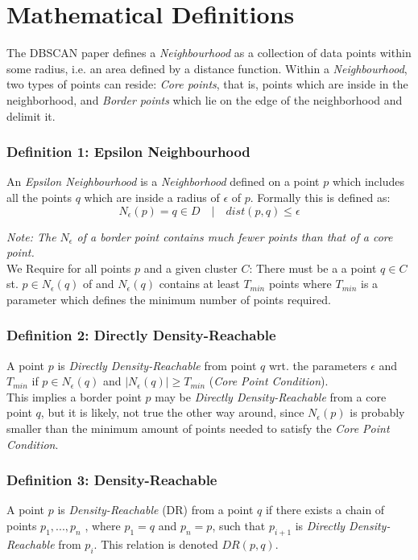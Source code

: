 \section{Mathematical Definitions}

The DBSCAN paper defines a \textit{Neighbourhood} as a collection of data points within some radius, i.e. an area defined by a distance function. Within a \textit{Neighbourhood}, two types of points can reside: \textit{Core points}, that is, points which are inside in the neighborhood, and \textit{Border points } which lie on the edge of the neighborhood and delimit it. 

\subsubsection*{Definition 1: Epsilon Neighbourhood}
An \textit{Epsilon Neighbourhood} is a \textit{Neighborhood} defined on a point $p$ which includes all the points $q$ which are inside a radius of $\epsilon$ of $p$. Formally this is defined as:\\

$$N_{\epsilon} (p) = q \in D \quad|\quad dist(p,q) \leq \epsilon$$

\textit{Note: The $N_{\epsilon}$ of a border point contains much fewer points than that of a core point. }\\

We Require for all points $p$ and a given cluster $C$: There must be a a point $q \in C$ st. $p \in N_{\epsilon}(q)$ of and $N_{\epsilon}(q)$ contains at least $T_{min}$ points where $T_{min}$ is a parameter which defines the minimum number of points required.

\subsubsection*{Definition 2: Directly Density-Reachable}
A point $p$ is \textit{Directly Density-Reachable} from point $q$ wrt. the parameters $\epsilon$ and $T_{min}$ if $p \in N_{\epsilon}(q)$ and $|N_{\epsilon}(q)| \geq T_{min}$ (\textit{Core Point Condition}).\\

This implies a border point $p$ may be \textit{Directly Density-Reachable} from a core point $q$, but it is likely, not true the other way around, since $N_{\epsilon}(p)$ is probably smaller than the minimum amount of points needed to satisfy the \textit{Core Point Condition}.

\subsubsection*{Definition 3: Density-Reachable}
A point $p$ is \textit{Density-Reachable} (DR) from a point $q$ if
there exists a chain of points $p_1, ..., p_n$ , where $p_1 = q$ and $p_n = p$, such that $p_{i+1}$ is \textit{Directly Density-Reachable} from $p_i$.
This relation is denoted $DR(p,q)$.\\

